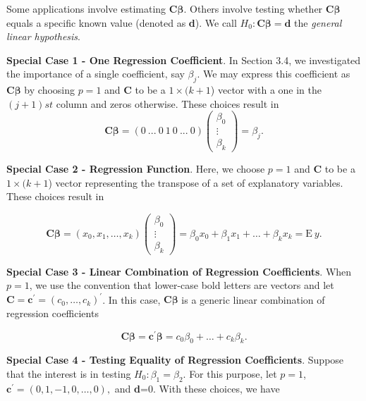 Some applications involve estimating $\mathbf{C} \boldsymbol \beta$.
Others involve testing whether $\mathbf{C} \boldsymbol \beta$ equals
a specific known value (denoted as \textbf{d}). We call
$H_{0}:\mathbf{C \boldsymbol \beta =d}$ the \emph{general linear
hypothesis}.

\textbf{Special Case 1 - One Regression Coefficient}. In Section
3.4, we investigated the importance of a single coefficient, say
$\beta_j.$ We may express this coefficient as $\mathbf{C}
\boldsymbol \beta$ by choosing $p=1$ and \textbf{C} to be a $1\times
(k+1$) vector with a one in the $(j+1)st$ column and zeros
otherwise. These choices result in
\begin{equation*}
\mathbf{C \boldsymbol \beta =}\left( 0~...~0~1~0~...~0\right) \left(
\begin{array}{c}
\beta _{0} \\
\vdots  \\
\beta _{k}%
\end{array}
\right) =\beta_j.
\end{equation*}

\textbf{Special Case 2 - Regression Function}. Here, we choose $p=1$
and \textbf{C} to be a $1\times (k+1$) vector representing the
transpose of a set of explanatory variables. These choices result in

\begin{equation*}
\mathbf{C \boldsymbol \beta =}\left(x_0,x_1, \ldots, x_k \right)
\left(
\begin{array}{c}
\beta _0 \\
\vdots  \\
\beta _k
\end{array}
\right) = \beta _0 x_0 + \beta_1 x_1 +\ldots + \beta_k x_k =
\mathrm{E} ~y.
\end{equation*}


\textbf{Special Case 3 - Linear Combination of Regression
Coefficients}. When $p=1$, we use the convention that lower-case
bold letters are vectors and let $\mathbf{C = c^{\prime}}=
\left(c_0, \ldots, c_k \right)^{\prime}$. In this case, $\mathbf{C}
\boldsymbol \beta$ is a generic linear combination of regression
coefficients

\begin{equation*}
\mathbf{C} \boldsymbol \beta =\mathbf{c}^{\prime} \boldsymbol \beta
= c_0 \beta_0 + \ldots + c_k \beta_k.
\end{equation*}

\bigskip

\textbf{Special Case 4 - Testing Equality of Regression
Coefficients}. Suppose that the interest is in testing $H_{0}:
\beta_1 = \beta_2.$ For this purpose, let $p=1$,
$\mathbf{c}^{\prime}= \left(0,1, -1, 0, \ldots, 0\right),$ and
\textbf{d}=0. With these choices, we have


